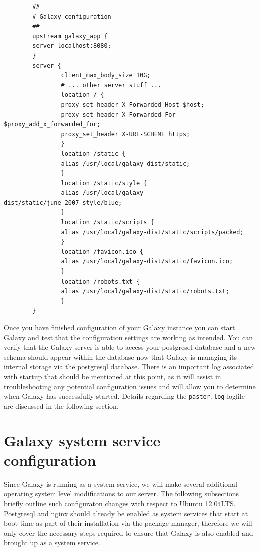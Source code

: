 \documentclass[a4paper,10pt]{article}
\begin{document}
\begin{lstlisting}
        ##
        # Galaxy configuration
        ##
        upstream galaxy_app {
        server localhost:8080;
        }
        server {
                client_max_body_size 10G;
                # ... other server stuff ...
                location / {
                proxy_set_header X-Forwarded-Host $host;
                proxy_set_header X-Forwarded-For $proxy_add_x_forwarded_for;
                proxy_set_header X-URL-SCHEME https;
                }
                location /static {
                alias /usr/local/galaxy-dist/static;
                }
                location /static/style {
                alias /usr/local/galaxy-dist/static/june_2007_style/blue;
                }
                location /static/scripts {
                alias /usr/local/galaxy-dist/static/scripts/packed;
                }
                location /favicon.ico {
                alias /usr/local/galaxy-dist/static/favicon.ico;
                }
                location /robots.txt {
                alias /usr/local/galaxy-dist/static/robots.txt;
                }
        }
\end{lstlisting}

Once you have finished configuration of your Galaxy instance you can start Galaxy and test that the configuration settings are working as intended.  You can verify that the Galaxy server is able to access your postgresql database and a new schema should appear within the database now that Galaxy is managing its internal storage via the postgresql database.  There is an important log associated with startup that should be mentioned at this point, as it will assist in troubleshooting any potential configuration issues and will allow you to determine when Galaxy has successfully started.  Details regarding the \texttt{\footnotesize{paster.log}} logfile are discussed in the following section.

\section{Galaxy system service configuration}
Since Galaxy is running as a system service, we will make several additional operating system level modifications to our server.  The following subsections briefly outline such configuraton changes with respect to Ubuntu 12.04LTS.  Postgresql and nginx should already be enabled as system services that start at boot time as part of their installation via the package manager, therefore we will only cover the necessary steps required to ensure that Galaxy is also enabled and brought up as a system service.
\end{document}
